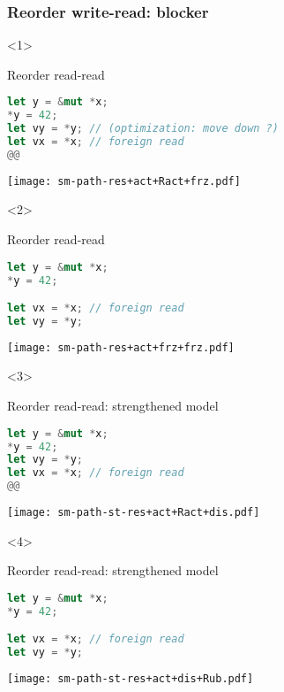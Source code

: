 \begin{frame}[fragile, t]
    \frametitle{Reorder write-read: blocker}
    \begin{onlyenv}<1>
        \begin{block}{{\cmark} Reorder read-read}
            \begin{lstlisting}[language=rust, escapechar=@]
let y = &mut *x;
*y = 42;
let vy = *y; // (optimization: move down ?)
let vx = *x; // foreign read
@@
            \end{lstlisting}
        \end{block}
        \texttt{[image: sm-path-res+act+Ract+frz.pdf]}
    \end{onlyenv}

    \begin{onlyenv}<2>
        \begin{block}{{\cmark} Reorder read-read}
            \begin{lstlisting}[language=rust]
let y = &mut *x;
*y = 42;

let vx = *x; // foreign read
let vy = *y;
            \end{lstlisting}
        \end{block}
        \texttt{[image: sm-path-res+act+frz+frz.pdf]}
    \end{onlyenv}

    \begin{onlyenv}<3>
        \begin{block}{{\xmark} Reorder read-read: strengthened model}
            \begin{lstlisting}[language=rust, escapechar=@]
let y = &mut *x;
*y = 42;
let vy = *y;
let vx = *x; // foreign read
@@
            \end{lstlisting}
        \end{block}
        \texttt{[image: sm-path-st-res+act+Ract+dis.pdf]}
    \end{onlyenv}

    \begin{onlyenv}<4>
        \begin{block}{{\xmark} Reorder read-read: strengthened model}
            \begin{lstlisting}[language=rust]
let y = &mut *x;
*y = 42;

let vx = *x; // foreign read
let vy = *y;
            \end{lstlisting}
        \end{block}
        \texttt{[image: sm-path-st-res+act+dis+Rub.pdf]}
    \end{onlyenv}
\end{frame}

